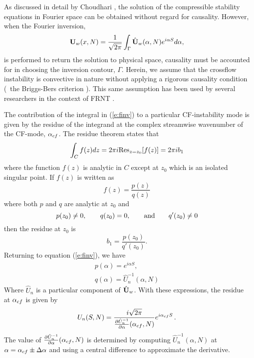 As discussed in detail by Choudhari \cite{Choudhari:94}, the solution of the
compressible stability equations in Fourier space can be obtained without
regard for causality.  However, when the Fourier inversion,
%
\begin{equation} \label{e:finv}
  {\bf U}_w(x,N) = \frac{1}{\sqrt{2\pi}} \int_{\Gamma} 
                        \hat {{\bf U}}_w(\alpha,N) e^{i \alpha S} d\alpha ,
\end{equation}
%
is performed to return the solution to physical space, causality must be
accounted for in choosing the inversion contour, $\Gamma$.  Herein, we assume
that the crossflow instability is convective in nature without applying a
rigorous causality condition (\ie\ the Briggs-Bers criterion \cite{Bers:83}).
This same assumption has been used by several researchers in the context of
FRNT \cite{Choudhari:94,Crouch:94}.

The contribution of the integral in (\ref{e:finv}) to a particular
CF-instability mode is given by the residue of the integrand at the complex
streamwise wavenumber of the CF-mode, ${\alpha_{cf}}$.  The residue theorem states that
%
\begin{equation}
  \int_C f(z) dz = 2\pi i {\rm Res}_{z=z_0}[f(z)] = 2\pi i b_1
\end{equation}
%
where the function $f(z)$ is analytic in $C$ except at $z_0$ which is an
isolated singular point.  If $f(z)$ is written as
%
\begin{equation}
  f(z) = \frac{p(z)}{q(z)}
\end{equation}
%
where both $p$ and $q$ are analytic at $z_0$ and
%
\begin{equation}
  p(z_0) \ne 0, \qquad q(z_0) = 0, \qquad {\rm and} \qquad q'(z_0) \ne 0
\end{equation}
%
then the residue at $z_0$ is
%
\begin{equation}
  b_1 = \frac{p(z_0)}{q'(z_0)} .
\end{equation}
%
Returning to equation (\ref{e:finv}), we have
%
\begin{eqnarray}
  p(\alpha) = e^{i \alpha S} \comma \\
  q(\alpha) = \hat U_n^{-1}(\alpha,N)
\end{eqnarray}
%
Where $\hat U_n$ is a particular component of $\hat {{\bf U}}_w$.  With these
expressions, the residue at ${\alpha_{cf}}$ is given by
%
\begin{equation} \label{e:residue}
  U_n(S,N) = \frac{ i \sqrt{2\pi} }
                  { \frac{\partial \hat U_n^{-1}}
                         {\partial \alpha}({\alpha_{cf}},N) } e^{i {\alpha_{cf}} S} {\, .}
\end{equation}
%
The value of $\frac{\partial \hat U_n^{-1}}{\partial \alpha}({\alpha_{cf}},N)$ is
determined by computing $\hat U_n^{-1} (\alpha,N)$ at $\alpha = {\alpha_{cf}} \pm
\Delta\alpha$ and using a central difference to approximate the
derivative.

